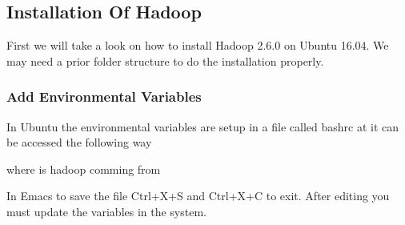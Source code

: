 \subsection{Installation Of Hadoop}\label{installation-of-hadoop}

First we will take a look on how to install Hadoop 2.6.0 on Ubuntu
16.04. We may need a prior folder structure to do the installation
properly.

\begin{Shaded}
\begin{Highlighting}[]
\NormalTok{$ } 
\NormalTok{$ } 
\NormalTok{$ } 
\end{Highlighting}
\end{Shaded}

\subsubsection{Add Environmental
Variables}\label{add-environmental-variables}

In Ubuntu the environmental variables are setup in a file called bashrc
at it can be accessed the following way

\begin{Shaded}
\begin{Highlighting}[]
\NormalTok{$ } 
\end{Highlighting}
\end{Shaded}

where is hadoop comming from

\begin{Shaded}
\begin{Highlighting}[]
 
 
 
 
 
\end{Highlighting}
\end{Shaded}

In Emacs to save the file Ctrl+X+S and Ctrl+X+C to exit. After editing
you must update the variables in the system.

